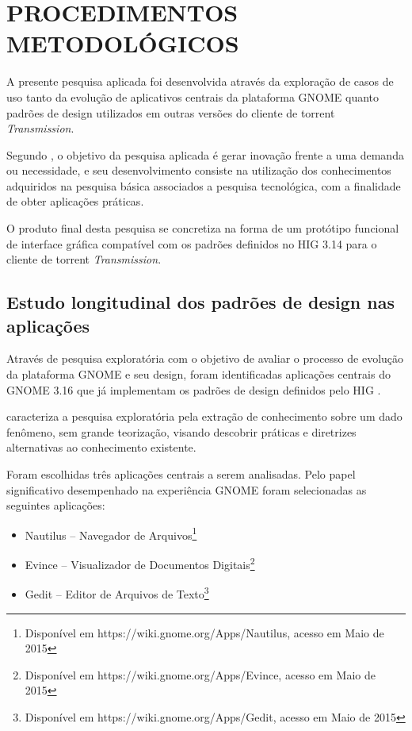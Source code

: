 \chapter{PROCEDIMENTOS METODOLÓGICOS}

A presente pesquisa aplicada foi desenvolvida através da exploração de casos de
uso tanto da evolução de aplicativos centrais da plataforma GNOME quanto padrões
de design utilizados em outras versões do cliente de torrent
\textit{Transmission}.

Segundo , o objetivo da pesquisa aplicada é
gerar inovação frente a uma demanda ou necessidade, e seu desenvolvimento
consiste na utilização dos conhecimentos adquiridos na pesquisa básica
associados a pesquisa tecnológica, com a finalidade de obter aplicações
práticas.

O produto final desta pesquisa se concretiza na forma de um protótipo funcional
de interface gráfica compatível com os padrões definidos no HIG 3.14 para o
cliente de torrent \textit{Transmission}.

\section{Estudo longitudinal dos padrões de design nas aplicações}
\label{sec:chronologic-analysis}

Através de pesquisa exploratória com o objetivo de avaliar o processo de
evolução da plataforma GNOME e seu design, foram identificadas aplicações
centrais do GNOME 3.16 que já implementam os padrões de design definidos pelo
HIG \cite{gnome314hig}.

 caracteriza a pesquisa exploratória pela
extração de conhecimento sobre um dado fenômeno, sem grande teorização, visando
descobrir práticas e diretrizes alternativas ao conhecimento existente.

Foram escolhidas três aplicações centrais a serem analisadas. Pelo papel
significativo desempenhado na experiência GNOME foram selecionadas as seguintes
aplicações:

\begin{itemize}
    \item Nautilus -- Navegador de Arquivos\footnote{Disponível em https://wiki.gnome.org/Apps/Nautilus, acesso em Maio de 2015}
    \item Evince -- Visualizador de Documentos Digitais\footnote{Disponível em https://wiki.gnome.org/Apps/Evince, acesso em Maio de 2015}
    \item Gedit -- Editor de Arquivos de Texto\footnote{Disponível em https://wiki.gnome.org/Apps/Gedit, acesso em Maio de 2015}
\end{itemize}

